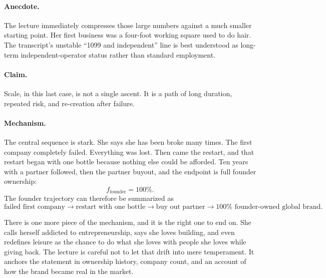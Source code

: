 \paragraph{Anecdote.}
The lecture immediately compresses those large numbers against a much smaller starting point. Her first business was a four-foot working square used to do hair. The transcript's unstable ``1099 and independent'' line is best understood as long-term independent-operator status rather than standard employment.

\paragraph{Claim.}
Scale, in this last case, is not a single ascent. It is a path of long duration, repeated risk, and re-creation after failure.

\paragraph{Mechanism.}
The central sequence is stark. She says she has been broke many times. The first company completely failed. Everything was lost. Then came the restart, and that restart began with one bottle because nothing else could be afforded. Ten years with a partner followed, then the partner buyout, and the endpoint is full founder ownership:
\begin{equation}
f_{\text{founder}} = 100\%.
\end{equation}
The founder trajectory can therefore be summarized as
\begin{equation}
\text{failed first company}
\to
\text{restart with one bottle}
\to
\text{buy out partner}
\to
100\% \text{ founder-owned global brand}.
\end{equation}

There is one more piece of the mechanism, and it is the right one to end on. She calls herself addicted to entrepreneurship, says she loves building, and even redefines leisure as the chance to do what she loves with people she loves while giving back. The lecture is careful not to let that drift into mere temperament. It anchors the statement in ownership history, company count, and an account of how the brand became real in the market.

